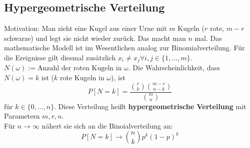 \subsection{Hypergeometrische Verteilung}
Motivation: Man zieht eine Kugel aus einer Urne mit $m$ Kugeln ($r$ rote, $m-r$ schwarze) und legt sie nicht wieder zur\"uck. Das macht man $n$ mal. Das mathematische Modell ist im Wesentlichen analog zur Binomialverteilung. F\"ur die Ereignisse gilt diesmal zus\"atzlich $x_i\neq x_j\forall i,j\in\{1,...,m\}$. $N(\omega):=\text{Anzahl der roten Kugeln in }\omega$. Die Wahrscheinlichkeit, dass $N(\omega)=k$ ist ($k$ rote Kugeln in $\omega$), ist
\[P[N=k]=\frac{\binom rk\binom{m-r}{n-k}}{\binom mn}\]
f\"ur $k\in\{0,...,n\}$. Diese Verteilung hei\ss t \textbf{hypergeometrische Verteilung} mit Parametern $m,r,n$.\\
F\"ur $n\rightarrow\infty$ n\"ahert sie sich an die Binoialverteilung an:
\[P[N=k]\rightarrow\binom nk p^k(1-p)^k\]

